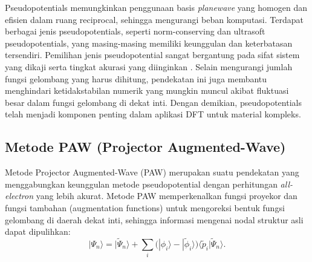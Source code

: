 Pseudopotentials memungkinkan penggunaan basis \emph{planewave} yang homogen dan efisien dalam ruang reciprocal, sehingga mengurangi beban komputasi. Terdapat berbagai jenis pseudopotentials, seperti norm-conserving dan ultrasoft pseudopotentials, yang masing-masing memiliki keunggulan dan keterbatasan tersendiri. Pemilihan jenis pseudopotential sangat bergantung pada sifat sistem yang dikaji serta tingkat akurasi yang diinginkan \citep{Payne1992}. Selain mengurangi jumlah fungsi gelombang yang harus dihitung, pendekatan ini juga membantu menghindari ketidakstabilan numerik yang mungkin muncul akibat fluktuasi besar dalam fungsi gelombang di dekat inti. Dengan demikian, pseudopotentials telah menjadi komponen penting dalam aplikasi DFT untuk material kompleks. \subsection{Metode PAW (Projector Augmented-Wave)}
Metode Projector Augmented-Wave (PAW) merupakan suatu pendekatan yang menggabungkan keunggulan metode pseudopotential dengan perhitungan \emph{all-electron} yang lebih akurat. Metode PAW memperkenalkan fungsi proyekor dan fungsi tambahan (augmentation functions) untuk mengoreksi bentuk fungsi gelombang di daerah dekat inti, sehingga informasi mengenai nodal struktur asli dapat dipulihkan:
\begin{equation}
    |\Psi_n\rangle = |\tilde{\Psi}_n\rangle + \sum_i \Big(|\phi_i\rangle - |\tilde{\phi}_i\rangle\Big) \langle \tilde{p}_i |
 \tilde{\Psi}_n \rangle.
\end{equation}


